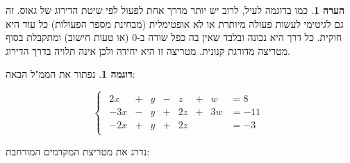 \documentclass[12pt]{report}
\theoremstyle{plain}
\theoremstyle{definition}
\newtheorem{example}{דוגמה}[chapter]
\newtheorem{remark}{הערה}[chapter]
\newcommand{\0}{\mathbf{0}}
\begin{document}
\begin{remark}
כמו בדוגמה לעיל, לרוב יש יותר מדרך אחת לפעול לפי שיטת הדירוג של גאוס. זה גם לגיטימי לעשות פעולה מיותרת או לא אופטימלית (מבחינת מספר הפעולות) כל עוד היא חוקית. כל דרך היא נכונה ובלבד שאין בה כפל שורה ב-$0$ (או טעות חישוב) ומתקבלת בסוף מטריצה מדורגת קנונית. מטריצה זו היא יחידה ולכן אינה תלויה בדרך הדירוג.
\end{remark}

\begin{example}
נפתור את הממ"ל הבאה:

$$
\begin{cases}
\begin{alignedat}{8}
 2x &{}+{}&  y &{}-{}&  z &{}+{}&  w &=  8 \\[4pt]
-3x &{}-{}&  y &{}+{}& 2z &{}+{}& 3w &= -11 \\[4pt]
-2x &{}+{}&  y &{}+{}& 2z &     &    &= -3
\end{alignedat}
\end{cases}
$$

נדרג את מטריצת המקדמים המורחבת:


\end{example}
\end{document}
